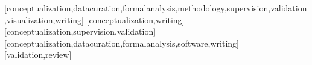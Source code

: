 \documentclass[spanish]{textolivre}
\begin{document}
\printbibliography\label{sec-bib}


\begin{contributors}
[conceptualization,datacuration,formalanalysis,methodology,supervision,validation,visualization,writing]
[conceptualization,writing]
[conceptualization,supervision,validation]
[conceptualization,datacuration,formalanalysis,software,writing]
[validation,review]
\end{contributors}
\end{document}
